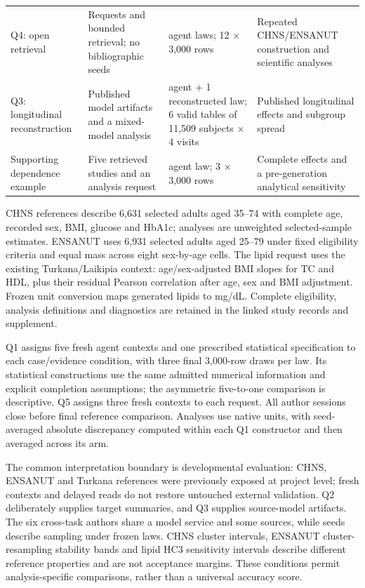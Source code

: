 \documentclass[10pt,twocolumn]{article}
\begin{document}
\begin{table}[t]
\begin{tabularx}{\textwidth}{@{}>{\raggedright\arraybackslash}X>{\raggedright\arraybackslash}X>{\raggedright\arraybackslash}X>{\raggedright\arraybackslash}X@{}}
Q4: open retrieval & Requests and bounded retrieval; no bibliographic seeds & 4 agent laws; 12 × 3,000 rows & Repeated CHNS/ENSANUT construction and scientific analyses \\

Q3: longitudinal reconstruction & Published model artifacts and a mixed-model analysis & 1 agent + 1 reconstructed law; 6 valid tables of 11,509 subjects × 4 visits & Published longitudinal effects and subgroup spread \\

Supporting dependence example & Five retrieved studies and an analysis request & 1 agent law; 3 × 3,000 rows & Complete effects and a pre-generation analytical sensitivity \\

\bottomrule

\end{tabularx}

\end{table}

CHNS references describe 6,631 selected adults aged 35–74 with complete age, recorded sex, BMI, glucose and HbA1c; analyses are unweighted selected-sample estimates. ENSANUT uses 6,931 selected adults aged 25–79 under fixed eligibility criteria and equal mass across eight sex-by-age cells. The lipid request uses the existing Turkana/Laikipia context: age/sex-adjusted BMI slopes for TC and HDL, plus their residual Pearson correlation after age, sex and BMI adjustment. Frozen unit conversion maps generated lipids to mg/dL. Complete eligibility, analysis definitions and diagnostics are retained in the linked study records and supplement.


Q1 assigns five fresh agent contexts and one prescribed statistical specification to each case/evidence condition, with three final 3,000-row draws per law. Its statistical constructions use the same admitted numerical information and explicit completion assumptions; the asymmetric five-to-one comparison is descriptive. Q5 assigns three fresh contexts to each request. All author sessions close before final reference comparison. Analyses use native units, with seed-averaged absolute discrepancy computed within each Q1 constructor and then averaged across its arm.


The common interpretation boundary is developmental evaluation: CHNS, ENSANUT and Turkana references were previously exposed at project level; fresh contexts and delayed reads do not restore untouched external validation. Q2 deliberately supplies target summaries, and Q3 supplies source-model artifacts. The six cross-task authors share a model service and some sources, while seeds describe sampling under frozen laws. CHNS cluster intervals, ENSANUT cluster-resampling stability bands and lipid HC3 sensitivity intervals describe different reference properties and are not acceptance margins. These conditions permit analysis-specific comparisons, rather than a universal accuracy score.
\end{document}
